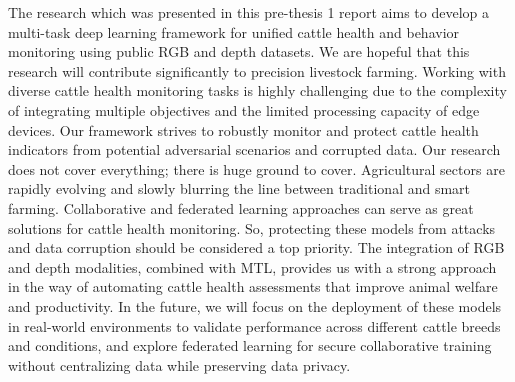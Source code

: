 The research which was presented in this pre-thesis 1 report aims to develop a multi-task deep learning framework for unified cattle health and behavior monitoring using public RGB and depth datasets. We are hopeful that this research will contribute significantly to precision livestock farming. Working with diverse cattle health monitoring tasks is highly challenging due to the complexity of integrating multiple objectives and the limited processing capacity of edge devices. Our framework strives to robustly monitor and protect cattle health indicators from potential adversarial scenarios and corrupted data. Our research does not cover everything; there is huge ground to cover. Agricultural sectors are rapidly evolving and slowly blurring the line between traditional and smart farming. Collaborative and federated learning approaches can serve as great solutions for cattle health monitoring. So, protecting these models from attacks and data corruption should be considered a top priority. The integration of RGB and depth modalities, combined with MTL, provides us with a strong approach in the way of automating cattle health assessments that improve animal welfare and productivity. In the future, we will focus on the deployment of these models in real-world environments to validate performance across different cattle breeds and conditions, and explore federated learning for secure collaborative training without centralizing data while preserving data privacy.